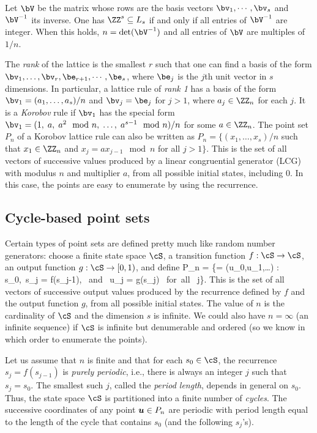 Let $\bV$ be the matrix whose rows are the basis vectors
$\bv_1,\cdots,\bv_s$ and $\bV^{-1}$ its inverse.
One has $\ZZ^s\subseteq L_s$ if and only if
all entries of $\bV^{-1}$ are integer.
When this holds, $n = \det(\bV^{-1})$
and all entries of $\bV$ are multiples of $1/n$.

The \emph{rank} of the lattice is the smallest $r$ such that one can
find a basis of the form $\bv_1,\dots, \bv_r,\be_{r+1},\cdots,\be_s$,
where $\be_j$ is the $j$th unit vector in $s$ dimensions.
In particular, a lattice rule of \emph{rank 1} has a basis of the form
$\bv_1 = (a_1, \dots, a_{s})/n$ and $\bv_j = \be_j$ for $j>1$,
where $a_j \in\ZZ_n$ for each $j$.
It is a \emph{Korobov} rule if $\bv_1$ has the special
form $\bv_1 = (1,\; a,\; a^2 \mod n,\; \dots,\; a^{s-1} \mod n)/n$
for some $a\in\ZZ_n$.
The point set $P_n$ of a Korobov lattice rule can also be written as
$P_n = \{(x_1,\dots,x_s)/n$ such that $x_1\in\ZZ_n$ and
$x_j = a x_{j-1} \mod n$ for all $j > 1\}$.  This is the set of all
vectors of successive values produced by a linear congruential generator
(LCG) with modulus $n$ and multiplier $a$, from all possible initial
states, including 0.  In this case, the points are easy to enumerate
by using the recurrence.


\subsection*{Cycle-based point sets}

Certain types of point sets are defined pretty much like random number
generators: choose a finite state space $\cS$, a transition function
$f : \cS\to\cS$, an output function $g : \cS\to [0,1)$, and define
\eq
 P_n = \{\bu = (u_0,u_1,\dots) : s_0\in\cS,\ s_j = f(s_{j-1}),
               \mbox{ and } u_j = g(s_j) \mbox{ for all } j\}.
\endeq
This is the set of all vectors of successive output values produced
by the recurrence defined by $f$ and the output function $g$, from all
possible initial states.
The value of $n$ is the cardinality of $\cS$ and the dimension $s$
is infinite.  We could also have $n = \infty$ (an infinite sequence)
if $\cS$ is infinite but denumerable and ordered (so we know in which
order to enumerate the points).

Let us assume that $n$ is finite and that for each $s_0\in\cS$,
the recurrence $s_j = f(s_{j-1})$ is \emph{purely periodic}, i.e.,
there is always an integer $j$ such that $s_j = s_0$.
The smallest such $j$, called the \emph{period length}, depends in
general on $s_0$.  Thus, the state space $\cS$ is partitioned into a
finite number of \emph{cycles}.  The successive coordinates of any point
$\mbox{\boldmath $u$}\in P_n$ are periodic with period length equal to the length of the
cycle that contains $s_0$ (and the following $s_j$'s).

